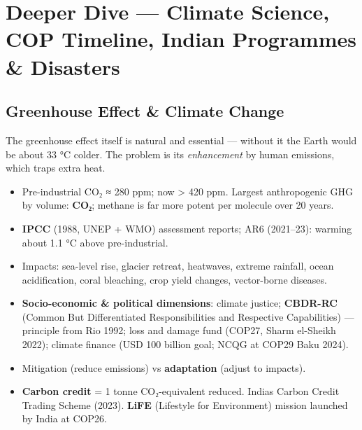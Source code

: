 \endgroup

\needspace{161pt}

\hypertarget{p1-09--7-deeper-dive--climate-science-cop-timeline-indian-programmes--disasters}{%
\section{Deeper Dive --- Climate Science, COP Timeline, Indian Programmes \& Disasters}\label{p1-09--7-deeper-dive--climate-science-cop-timeline-indian-programmes--disasters}}

\needspace{125pt}

\hypertarget{p1-09--71-greenhouse-effect--climate-change}{%
\subsection{Greenhouse Effect \& Climate Change}\label{p1-09--71-greenhouse-effect--climate-change}}

The greenhouse effect itself is natural and essential --- without it the Earth would be about 33 °C colder.
The problem is its \emph{enhancement} by human emissions, which traps extra heat.



\begin{itemize}
\tightlist
\item
  Pre-industrial CO₂ ≈ 280 ppm; now \textgreater{} 420 ppm. Largest anthropogenic GHG by volume: \textbf{CO₂}; methane is far more potent per molecule over 20 years.
\item
  \textbf{IPCC} (1988, UNEP + WMO) assessment reports; AR6 (2021--23): warming about 1.1 °C above pre-industrial.
\item
  Impacts: sea-level rise, glacier retreat, heatwaves, extreme rainfall, ocean acidification, coral bleaching, crop yield changes, vector-borne diseases.
\item
  \textbf{Socio-economic \& political dimensions}: climate justice; \textbf{CBDR-RC} (Common But Differentiated Responsibilities and Respective Capabilities) --- principle from Rio 1992; loss and damage fund (COP27, Sharm el-Sheikh 2022); climate finance (USD 100 billion goal; NCQG at COP29 Baku 2024).
\item
  Mitigation (reduce emissions) vs \textbf{adaptation} (adjust to impacts).
\item
  \textbf{Carbon credit} = 1 tonne CO₂-equivalent reduced. India\textquotesingle s Carbon Credit Trading Scheme (2023). \textbf{LiFE} (Lifestyle for Environment) mission launched by India at COP26.
\end{itemize}

